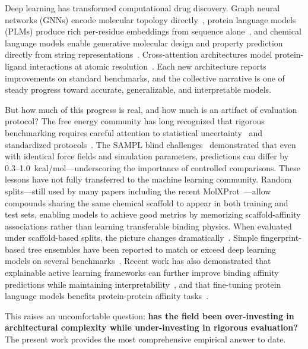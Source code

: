 \documentclass[11pt,twocolumn,a4paper]{article}
\begin{document}
Deep learning has transformed computational drug discovery. Graph neural networks (GNNs) encode molecular topology directly~\cite{kipf2017gcn,gilmer2017mpnn}, protein language models (PLMs) produce rich per-residue embeddings from sequence alone~\cite{lin2023esm2}, and chemical language models enable generative molecular design and property prediction directly from string representations~\cite{ozcelik2024s4,ozcelik2024hitchhiker}. Cross-attention architectures model protein-ligand interactions at atomic resolution~\cite{capla2023,cucco2026molxprot}. Each new architecture reports improvements on standard benchmarks, and the collective narrative is one of steady progress toward accurate, generalizable, and interpretable models.

But how much of this progress is real, and how much is an artifact of evaluation protocol? The free energy community has long recognized that rigorous benchmarking requires careful attention to statistical uncertainty~\cite{shirts2008mbar,paliwal2011benchmark} and standardized protocols~\cite{mey2024benchmark}. The SAMPL blind challenges~\cite{rizzi2020sampl6} demonstrated that even with identical force fields and simulation parameters, predictions can differ by 0.3--1.0~kcal/mol---underscoring the importance of controlled comparisons. These lessons have not fully transferred to the machine learning community. Random splits---still used by many papers including the recent MolXProt~\cite{cucco2026molxprot}---allow compounds sharing the same chemical scaffold to appear in both training and test sets, enabling models to achieve good metrics by memorizing scaffold-affinity associations rather than learning transferable binding physics. When evaluated under scaffold-based splits, the picture changes dramatically~\cite{balm2024,landrum2024ic50}. Simple fingerprint-based tree ensembles have been reported to match or exceed deep learning models on several benchmarks~\cite{balm2024,gorantla2023proteins,gorantla2024benchmarking}. Recent work has also demonstrated that explainable active learning frameworks can further improve binding affinity predictions while maintaining interpretability~\cite{srivastava2026explainable}, and that fine-tuning protein language models benefits protein-protein affinity tasks~\cite{singh2026explainable}.

This raises an uncomfortable question: \textbf{has the field been over-investing in architectural complexity while under-investing in rigorous evaluation?} The present work provides the most comprehensive empirical answer to date.
\end{document}
